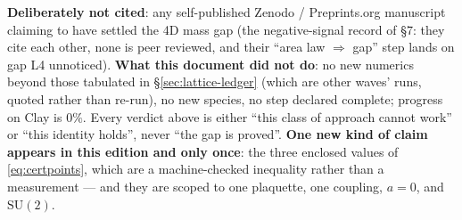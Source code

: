 \vspace{3pt}
\noindent
\textbf{Deliberately not cited}: any self-published Zenodo / Preprints.org manuscript claiming to have
settled the 4D mass gap (the negative-signal record of  \S7: they cite each other,
none is peer reviewed, and their ``area law $\Rightarrow$ gap'' step lands on gap L4 unnoticed).
\textbf{What this document did not do}: no new numerics beyond those tabulated in \S\ref{sec:lattice-ledger}
(which are other waves' runs, quoted rather than re-run), no new species, no step declared complete;
progress on Clay is $0\%$. Every verdict above is either ``this class of approach cannot work'' or
``this identity holds'', never ``the gap is proved''. \textbf{One new kind of claim appears in this
edition and only once}: the three enclosed values of \eqref{eq:certpoints}, which are a machine-checked
inequality rather than a measurement --- and they are scoped to one plaquette, one coupling, $a=0$, and
$\mathrm{SU}(2)$.
